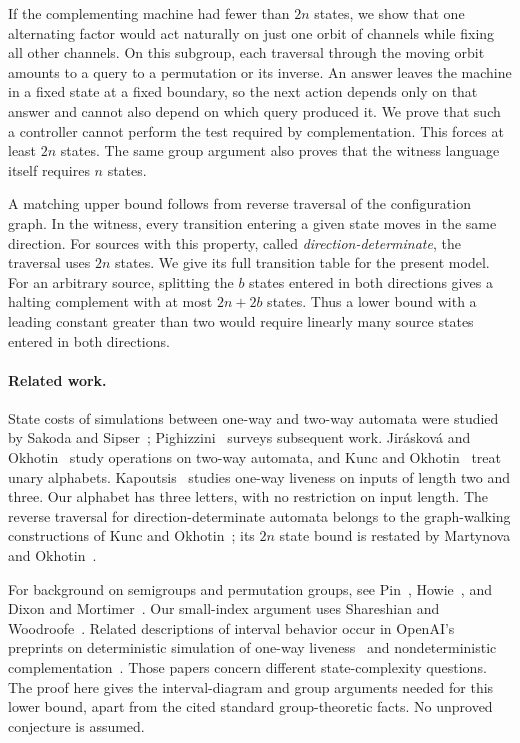 \documentclass[11pt,a4paper]{article}
\theoremstyle{definition}
\theoremstyle{remark}
\begin{document}
If the complementing machine had fewer than $2n$ states, we show that
one alternating factor would act naturally on just one orbit of
channels while fixing all other channels. On this subgroup, each
traversal through the moving orbit amounts to a query to a permutation
or its inverse. An answer leaves the machine in a fixed state at a
fixed boundary, so the next action depends only on that answer and
cannot also depend on which query produced it. We prove that such a
controller cannot perform the test required by complementation. This
forces at least $2n$ states. The same group argument also proves that
the witness language itself requires $n$ states.

A matching upper bound follows from reverse traversal of the
configuration graph. In the witness, every transition entering a
given state moves in the same direction. For sources with this
property, called \emph{direction-determinate}, the traversal uses
$2n$ states. We give its full transition table for the present model.
For an arbitrary source, splitting the $b$ states entered in both
directions gives a halting complement with at most $2n+2b$ states.
Thus a lower bound with a leading constant greater than two would
require linearly many source states entered in both directions.

\paragraph{Related work.}
State costs of simulations between one-way and two-way automata were
studied by Sakoda and Sipser~\cite{SakodaSipser1978};
Pighizzini~\cite{Pighizzini2012} surveys subsequent work.
Jir\'askov\'a and Okhotin~\cite{JiraskovaOkhotin2017} study operations
on two-way automata, and Kunc and Okhotin~\cite{KuncOkhotin2012}
treat unary alphabets. Kapoutsis~\cite{Kapoutsis2018} studies one-way
liveness on inputs of length two and three. Our alphabet has three
letters, with no restriction on input length. The reverse traversal
for direction-determinate automata belongs to the graph-walking
constructions of Kunc and Okhotin~\cite{kuncokhotin2020}; its $2n$
state bound is restated by Martynova and
Okhotin~\cite[Lemma~8]{martynovaokhotin2021}.

For background on semigroups and permutation groups, see
Pin~\cite{Pin1997}, Howie~\cite{Howie1995}, and Dixon and
Mortimer~\cite{DixonMortimer1996}. Our small-index argument uses
Shareshian and Woodroofe~\cite[Lemma~4.2]{SW}. Related descriptions
of interval behavior occur in OpenAI's preprints on deterministic
simulation of one-way liveness~\cite{OpenAILiveness2026} and
nondeterministic complementation~\cite{OpenAIComplementation2026}.
Those papers concern different state-complexity questions. The proof
here gives the interval-diagram and group arguments needed for this
lower bound, apart from the cited standard group-theoretic facts.
No unproved conjecture is assumed.
\end{document}
